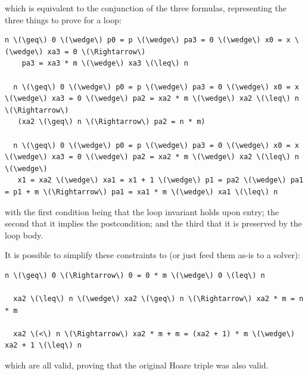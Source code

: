 \documentclass[11pt]{article}
\begin{document}
\newpage
which is equivalent to the conjunction of the three formulas, representing the three things to prove for a loop:
\begin{Verbatim}[commandchars=\\\{\}]
  n \(\geq\) 0 \(\wedge\) p0 = p \(\wedge\) pa3 = 0 \(\wedge\) x0 = x \(\wedge\) xa3 = 0 \(\Rightarrow\)
    pa3 = xa3 * m \(\wedge\) xa3 \(\leq\) n

  n \(\geq\) 0 \(\wedge\) p0 = p \(\wedge\) pa3 = 0 \(\wedge\) x0 = x \(\wedge\) xa3 = 0 \(\wedge\) pa2 = xa2 * m \(\wedge\) xa2 \(\leq\) n \(\Rightarrow\)
   (xa2 \(\geq\) n \(\Rightarrow\) pa2 = n * m)

  n \(\geq\) 0 \(\wedge\) p0 = p \(\wedge\) pa3 = 0 \(\wedge\) x0 = x \(\wedge\) xa3 = 0 \(\wedge\) pa2 = xa2 * m \(\wedge\) xa2 \(\leq\) n \(\wedge\)
   x1 = xa2 \(\wedge\) xa1 = x1 + 1 \(\wedge\) p1 = pa2 \(\wedge\) pa1 = p1 + m \(\Rightarrow\) pa1 = xa1 * m \(\wedge\) xa1 \(\leq\) n
\end{Verbatim}
with the first condition being that the loop invariant holds upon entry; the second that it implies the postcondition; and the third that it is preserved by the loop body.

It is possible to simplify these constraints to (or just feed them as-is to a solver):
\begin{Verbatim}[commandchars=\\\{\}]
  n \(\geq\) 0 \(\Rightarrow\) 0 = 0 * m \(\wedge\) 0 \(leq\) n

  xa2 \(\leq\) n \(\wedge\) xa2 \(\geq\) n \(\Rightarrow\) xa2 * m = n * m

  xa2 \(<\) n \(\Rightarrow\) xa2 * m + m = (xa2 + 1) * m \(\wedge\) xa2 + 1 \(\leq\) n
\end{Verbatim}
which are all valid, proving that the original Hoare triple was also valid.
\end{document}
